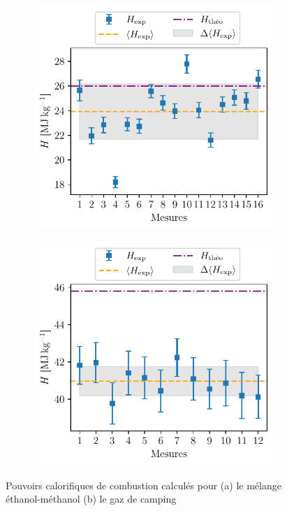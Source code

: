 \begin{figure}[h]
    \centering
    \begin{subfigure}{0.5\linewidth}
        \centering
        \includegraphics[width=\linewidth]{figures/ethanol.pdf}
        \caption{}
        \label{fig:H_etanol}
    \end{subfigure}%
    \begin{subfigure}{0.5\linewidth}
        \centering
        \includegraphics[width=\linewidth]{figures/gaz_camping.pdf}
        \caption{}
        \label{fig:H_gaz_camping}
    \end{subfigure}
    \caption{Pouvoirs calorifiques de combustion calculés pour (a) le mélange éthanol-méthanol (b) le gaz de camping}
\end{figure}

